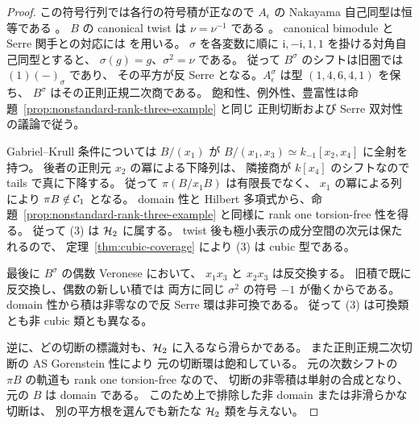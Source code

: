 \begin{proof}
この符号行列では各行の符号積が正なので
$A_\epsilon$ の Nakayama 自己同型は恒等である
\cite[Example 5.5]{RRZ2014}。
$B$ の canonical twist は $\nu=\nu^{-1}$ である
\cite[Lemma 1.5]{RRZ2014}。
canonical bimodule と Serre 関手との対応には \cite[Example 3.6(2)]{MU2021} を用いる。
$\sigma$ を各変数に順に $\mathrm i,-\mathrm i,1,1$ を掛ける対角自己同型とすると、
$\sigma(g)=g$、$\sigma^2=\nu$ である。
従って $B^\sigma$ のシフトは旧圏では $(1)(-)_{\sigma}$ であり、
その平方が反 Serre となる。$A_\epsilon^\sigma$ は型 $(1,4,6,4,1)$ を保ち、
$B^\sigma$ はその正則正規二次商である。
飽和性、例外性、豊富性は命題~\ref{prop:nonstandard-rank-three-example} と同じ
正則切断および Serre 双対性の議論で従う。

Gabriel--Krull 条件については $B/(x_1)$ が
$B/(x_1,x_3)\simeq k_{-1}[x_2,x_4]$ に全射を持つ。
後者の正則元 $x_2$ の冪による下降列は、
隣接商が $k[x_4]$ のシフトなので tails で真に下降する。
従って $\pi(B/x_1B)$ は有限長でなく、
$x_1$ の冪による列により $\pi B\notin\mathcal C_1$ となる。
domain 性と Hilbert 多項式から、命題~\ref{prop:nonstandard-rank-three-example}
と同様に rank one torsion-free 性を得る。
従って (3) は $\mathcal H_2$ に属する。
twist 後も極小表示の成分空間の次元は保たれるので、
定理~\ref{thm:cubic-coverage} により (3) は cubic 型である。

最後に $B^\sigma$ の偶数 Veronese において、
$x_1x_3$ と $x_2x_3$ は反交換する。
旧積で既に反交換し、偶数の新しい積では
両方に同じ $\sigma^2$ の符号 $-1$ が働くからである。
domain 性から積は非零なので反 Serre 環は非可換である。
従って (3) は可換類とも非 cubic 類とも異なる。

逆に、どの切断の標識対も、$\mathcal H_2$ に入るなら滑らかである。
また正則正規二次切断の AS Gorenstein 性により
元の切断環は飽和している。
元の次数シフトの $\pi B$ の軌道も rank one torsion-free なので、
切断の非零積は単射の合成となり、元の $B$ は domain である。
このため上で排除した非 domain または非滑らかな切断は、
別の平方根を選んでも新たな $\mathcal H_2$ 類を与えない。
\end{proof}
